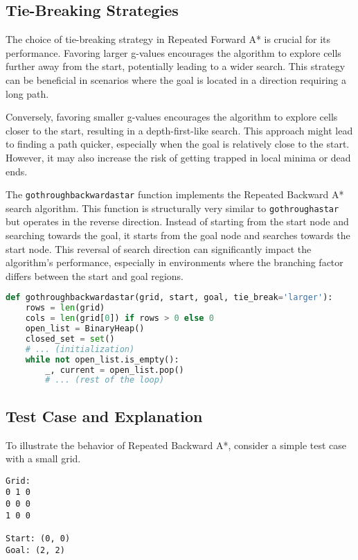 \documentclass[12pt]{article}
\begin{document}
\subsection{Tie-Breaking Strategies}

The choice of tie-breaking strategy in Repeated Forward A* is crucial for its performance. Favoring larger g-values encourages the algorithm to explore cells further away from the start, potentially leading to a wider search. This strategy can be beneficial in scenarios where the goal is located in a direction requiring a long path.

Conversely, favoring smaller g-values encourages the algorithm to explore cells closer to the start, resulting in a depth-first-like search. This approach might lead to finding a path quicker, especially when the goal is relatively close to the start. However, it may also increase the risk of getting trapped in local minima or dead ends.

The \texttt{gothroughbackwardastar} function implements the Repeated Backward A* search algorithm. This function is structurally very similar to \texttt{gothroughastar} but operates in the reverse direction. Instead of starting from the start node and searching towards the goal, it starts from the goal node and searches towards the start node. This reversal of search direction can significantly impact the algorithm's performance, especially in environments where the branching factor differs between the start and goal regions.

\begin{lstlisting}[language=Python, basicstyle=\ttfamily]
def gothroughbackwardastar(grid, start, goal, tie_break='larger'):
    rows = len(grid)
    cols = len(grid[0]) if rows > 0 else 0
    open_list = BinaryHeap()
    closed_set = set()
    # ... (initialization)
    while not open_list.is_empty():
        _, current = open_list.pop()
        # ... (rest of the loop)
\end{lstlisting}

\subsection{Test Case and Explanation}

To illustrate the behavior of Repeated Backward A*, consider a simple test case with a small grid.

\begin{verbatim}
Grid:
0 1 0
0 0 0
1 0 0

Start: (0, 0)
Goal: (2, 2)

\end{verbatim}
\end{document}
